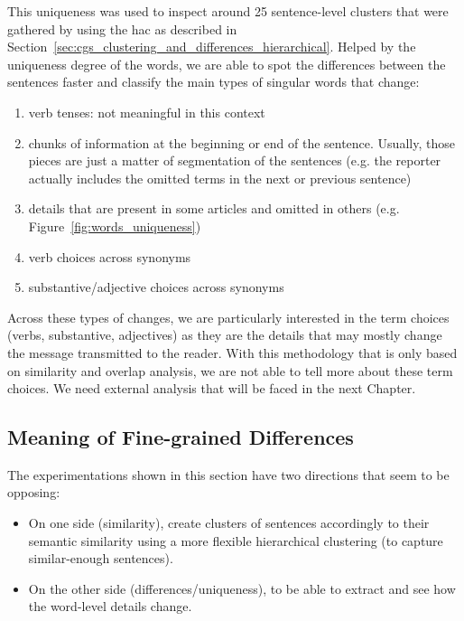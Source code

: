 This uniqueness was used to inspect around 25 sentence-level clusters that were gathered by using the \acrshort{hac} as described in Section~\ref{sec:cgs_clustering_and_differences_hierarchical}. Helped by the uniqueness degree of the words, we are able to spot the differences between the sentences faster and classify the main types of singular words that change:
\begin{enumerate}
    \item verb tenses: not meaningful in this context
    \item chunks of information at the beginning or end of the sentence. Usually, those pieces are just a matter of segmentation of the sentences (e.g. the reporter actually includes the omitted terms in the next or previous sentence) 
    \item details that are present in some articles and omitted in others (e.g. Figure~\ref{fig:words_uniqueness})
    \item verb choices across synonyms
    \item substantive/adjective choices across synonyms
\end{enumerate}

Across these types of changes, we are particularly interested in the term choices (verbs, substantive, adjectives) as they are the details that may mostly change the message transmitted to the reader.
With this methodology that is only based on similarity and overlap analysis, we are not able to tell more about these term choices. We need external analysis that will be faced in the next Chapter.

\subsection{\statusgreen Meaning of Fine-grained Differences}
The experimentations shown in this section have two directions that seem to be opposing: 
\begin{itemize}
    \item On one side (similarity), create clusters of sentences accordingly to their semantic similarity using a more flexible hierarchical clustering (to capture similar-enough sentences). %
    \item On the other side (differences/uniqueness), to be able to extract and see how the word-level details change.
\end{itemize}

